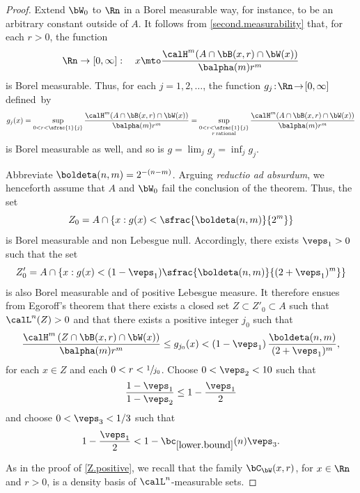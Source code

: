 \begin{proof}
Extend $\bW_0$ to $\Rn$ in a Borel measurable way, for instance, to be an arbitrary constant outside of $A$.
It follows from \ref{second.measurability} that, for each $r > 0$, the function
\[
\Rn \to [0,\infty]:\quad x \mto \frac{\calH^m (A \cap \bB(x,r) \cap \bW(x))}{\balpha(m)r^m}
\]
is Borel measurable.
Thus, for each $j\!=\!1,2,\ldots$, the function $g_j\!:\! \Rn \!\to\! [0,\infty]$ defined~by
\begin{equation*}
g_j(x) = \sup_{0 < r < \sfrac{1}{j}} \frac{\calH^m (A \cap \bB(x,r) \cap \bW(x))}{\balpha(m)r^m}
= \sup_{\substack{0 < r < \sfrac{1}{j}\\r \,\text{rational} }} \frac{\calH^m (A \cap \bB(x,r) \cap \bW(x))}{\balpha(m)r^m}
\end{equation*}
is Borel measurable as well, and so is $g = \lim_j g_j = \inf_j g_j$.
\par
Abbreviate $\boldeta(n,m) = 2^{-(n-m)}$.
Arguing \emph{reductio ad absurdum}, we henceforth assume that $A$ and $\bW_0$ fail the conclusion of the theorem.
Thus, the set
\[
Z_0 = A \cap \left\{ x: g(x) < \sfrac{\boldeta(n,m)}{2^m}\right\}
\]
is Borel measurable and non Lebesgue null.
Accordingly, there exists $\veps_1 > 0$ such that the set
\[
Z_0' = A \cap \left\{ x: g(x) < (1-\veps_1) \sfrac{\boldeta(n,m)}{(2+\veps_1)^m}\right\}
\]
is also Borel measurable and of positive Lebesgue measure.
It therefore ensues from Egoroff's theorem \cite[2.3.7]{GMT} that there exists a closed set $Z \subset Z'_0 \subset A$ such that $\calL^n(Z) > 0$ and that there exists a positive integer $j_0$ such that
\begin{equation}
\label{final.1}
\frac{\calH^m\left(Z \cap \bB(x,r) \cap \bW(x)\right)}{\balpha(m)r^m} \leq g_{j_0}(x) < (1-\veps_1)\, \frac{\boldeta(n,m)}{(2 + \veps_1)^m},
\end{equation}
for each $x \in Z$ and each $0 < r < \sfrac{1}{j_0}$.
Choose $0 < \veps_2 < 10$ such that
\begin{equation}
\label{final.2}
\frac{1-\veps_1}{1-\veps_2} \leq 1 - \frac{\veps_1}{2}
\end{equation}
and choose $0 < \veps_3 < 1/3$ such that
\begin{equation}
\label{final.3}
1 - \frac{\veps_1}{2} < 1 - \bc_{\ref{lower.bound}}(n) \veps_3.
\end{equation}
\par
As in the proof of \ref{Z.positive}, we recall that the family $\bC_\bW(x,r)$, for $x \in \Rn$ and $r > 0$, is a density basis of $\calL^n$-measurable sets.

\end{proof}
